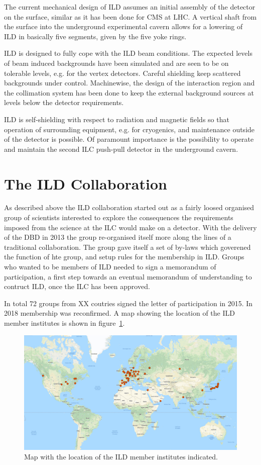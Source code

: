 \documentclass[%
 amsmath,amssymb,
 aps,
]{revtex4-1}
\begin{document}
The current mechanical design of ILD assumes an initial assembly of the detector on the surface, similar as it has been done for CMS at LHC. A vertical shaft from the surface into the underground experimental cavern allows for a lowering of ILD in basically five segments, given by the five yoke rings.

ILD is designed to fully cope with the ILD beam conditions. The expected levels of beam induced backgrounds have been simulated and are seen to be on tolerable levels, e.g. for the vertex detectors. Careful shielding keep scattered backgrounds under control. Machinewise, the design of the interaction region and the collimation system has been done to keep the external background sources at levels below the detector requirements.

ILD is self-shielding with respect to radiation and magnetic fields so that operation of surrounding equipment, e.g. for cryogenics, and maintenance outside of the detector is possible. Of paramount importance is the possibility to operate and maintain the second ILC push-pull detector in the underground cavern.

\section{The ILD Collaboration}
As described above the ILD collaboration started out as a fairly loosed organised group of scientists interested to explore the consequences the requirements imposed from the science at the ILC would make on a detector. With the delivery of the DBD in 2013 the group re-organised itself more along the lines of a traditional collaboration. The group gave itself a set of by-laws which goverened the function of hte group, and setup rules for the membership in ILD. Groups who wanted to be members of ILD needed to sign a memorandum of participation, a first step towards an eventual memorandum of understanding to contruct ILD, once the ILC has been approved. 

In total 72 groups from XX coutries signed the letter of participation in 2015. In 2018 membership was reconfirmed. A map showing the location of the ILD member institutes is shown in figure~\ref{ild-fig-membermap}.

\begin{figure}
    \centering
    \includegraphics[width=0.6\hsize]{figures/ILD_members_map.pdf}
    \caption{Map with the location of the ILD member institutes indicated.}
    \label{ild-fig-membermap}
\end{figure}
\end{document}
